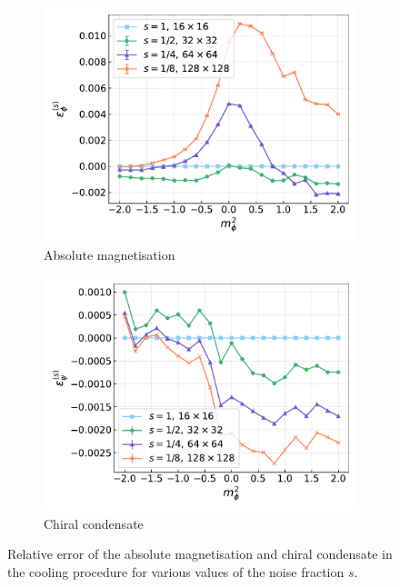 \begin{figure}[htp]
    \centering
    \begin{subfigure}[b]{0.48\textwidth}
        \includegraphics[width=1.0\textwidth]{figures/cooling/mass_scan/deviation.pdf}
        \caption{Absolute magnetisation}
    \end{subfigure}
    \begin{subfigure}[b]{0.48\textwidth}
        \includegraphics[width=1.0\textwidth]{figures/cooling/mass_scan/deviation_cond.pdf}
        \caption{Chiral condensate}
    \end{subfigure}
    \caption[Relative error in the cooling procedure at tree level.]{Relative error of the absolute magnetisation and chiral condensate in the cooling procedure for various values of the noise fraction $s$.}
    \label{fig:cooling_deviation}
\end{figure}\\
